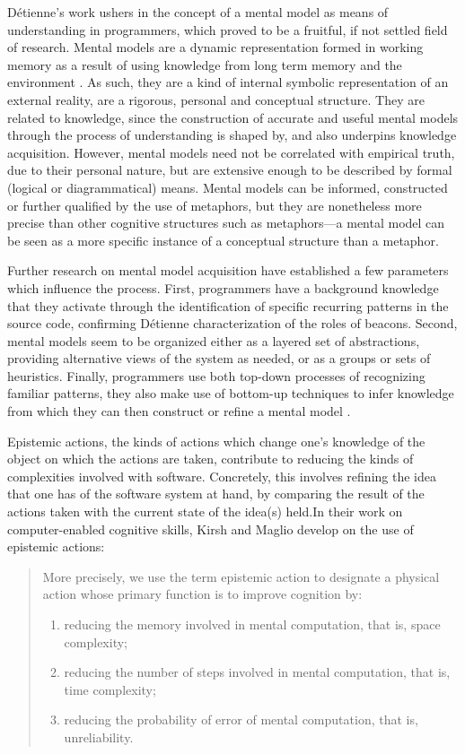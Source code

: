 Détienne's work ushers in the concept of a mental model as means of understanding in programmers, which proved to be a fruitful, if not settled field of research. Mental models are a dynamic representation formed in working memory as a result of using knowledge from long term memory and the environment \citep{canas_role_2001}. As such, they are a kind of internal symbolic representation of an external reality, are a rigorous, personal and conceptual structure. They are related to knowledge, since the construction of accurate and useful mental models through the process of understanding is shaped by, and also underpins knowledge acquisition. However, mental models need not be correlated with empirical truth, due to their personal nature, but are extensive enough to be described by formal (logical or diagrammatical) means. Mental models can be informed, constructed or further qualified by the use of metaphors, but they are nonetheless more precise than other cognitive structures such as metaphors—a mental model can be seen as a more specific instance of a conceptual structure than a metaphor.

Further research on mental model acquisition have established a few parameters which influence the process. First, programmers have a background knowledge that they activate through the identification of specific recurring patterns in the source code, confirming Détienne characterization of the roles of beacons. Second, mental models seem to be organized either as a layered set of abstractions, providing alternative views of the system as needed, or as a groups or sets of heuristics. Finally, programmers use both top-down processes of recognizing familiar patterns, they also make use of bottom-up techniques to infer knowledge from which they can then construct or refine a mental model \citep{heinonen_synthesizing_2023}.

Epistemic actions, the kinds of actions which change one's knowledge of the object on which the actions are taken, contribute to reducing the kinds of complexities involved with software. Concretely, this involves refining the idea that one has of the software system at hand, by comparing the result of the actions taken with the current state of the idea(s) held.In their work on computer-enabled cognitive skills, Kirsh and Maglio develop on the use of epistemic actions:

\begin{quote}
    More precisely, we use the term epistemic action to designate a physical action whose primary function is to improve cognition by:
    \begin{enumerate}
        \item{reducing the memory involved in mental computation, that is, space complexity;}
        \item{reducing the number of steps involved in mental computation, that is, time complexity;}
        \item{reducing the probability of error of mental computation, that is, unreliability.}
    \end{enumerate}
    \citep{kirsh_distinguishing_1994}
\end{quote}

